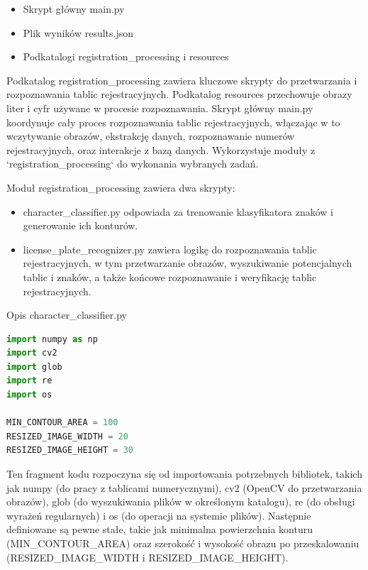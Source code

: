\documentclass[12pt,a4paper,oneside]{article}
\theoremstyle{definition}
\numberwithin{equation}{section}
\begin{document}
\begin{itemize}
  \item Skrypt główny main.py
  \item Plik wyników results.json
  \item Podkatalogi registration{\_}processing i resources
\end{itemize}



Podkatalog registration{\_}processing zawiera kluczowe skrypty do przetwarzania i rozpoznawania tablic rejestracyjnych. Podkatalog resources przechowuje obrazy liter i cyfr używane w procesie rozpoznawania.
Skrypt główny main.py koordynuje cały proces rozpoznawania tablic rejestracyjnych, włączając w to wczytywanie obrazów, ekstrakcję danych, rozpoznawanie numerów rejestracyjnych, oraz interakcje z bazą danych. Wykorzystuje moduły z `registration{\_}processing` do wykonania wybranych zadań.

Moduł registration{\_}processing zawiera dwa skrypty:

\begin{itemize}
  \item character{\_}classifier.py odpowiada za trenowanie klasyfikatora znaków i generowanie ich konturów.
  \item license{\_}plate{\_}recognizer.py zawiera logikę do rozpoznawania tablic rejestracyjnych, w tym przetwarzanie obrazów, wyszukiwanie potencjalnych tablic i znaków, a także końcowe rozpoznawanie i weryfikację tablic rejestracyjnych.
\end{itemize}

Opis character{\_}classifier.py

\begin{lstlisting}[language=Python]
import numpy as np
import cv2
import glob
import re
import os

MIN_CONTOUR_AREA = 100
RESIZED_IMAGE_WIDTH = 20
RESIZED_IMAGE_HEIGHT = 30

\end{lstlisting} 

Ten fragment kodu rozpoczyna się od importowania potrzebnych bibliotek, takich jak numpy (do pracy z tablicami numerycznymi), cv2 (OpenCV do przetwarzania obrazów), glob (do wyszukiwania plików w określonym katalogu), re (do obsługi wyrażeń regularnych) i os (do operacji na systemie plików). Następnie definiowane są pewne stałe, takie jak minimalna powierzchnia konturu (MIN{\_}CONTOUR{\_}AREA) oraz szerokość i wysokość obrazu po przeskalowaniu (RESIZED{\_}IMAGE{\_}WIDTH i RESIZED{\_}IMAGE{\_}HEIGHT).
\end{document}
